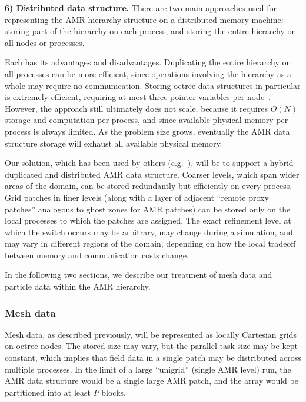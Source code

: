 \documentclass[10pt,twocolumn]{article}
\begin{document}
\textbf{6) Distributed data structure.} There are two main approaches
used for representing the AMR hierarchy structure on a distributed
memory machine: storing part of the hierarchy on each process, and
storing the entire hierarchy on all nodes or processes.

Each has its advantages and disadvantages.  Duplicating the entire
hierarchy on all processes can be more efficient, since operations
involving the hierarchy as a whole may require no communication.
Storing octree data structures in particular is extremely efficient,
requiring at most three pointer variables per node~\cite{FrPe02}.
However, the approach still ultimately does not scale, because it
requires $O(N)$ storage and computation per process, and since
available physical memory per process is always limited.  As the
problem size grows, eventually the AMR data structure storage will
exhaust all available physical memory.

Our solution, which has been used by others
(e.g.~\cite{@@@hybrid-storage}), will be to support a hybrid
duplicated and distributed AMR data structure.  Coarser levels, which
span wider areas of the domain, can be stored redundantly but
efficiently on every process.  Grid patches in finer levels (along
with a layer of adjacent ``remote proxy patches'' analogous to ghost
zones for AMR patches) can be stored only on the local processes to
which the patches are assigned.  The exact refinement level at which
the switch occurs may be arbitrary, may change during a simulation,
and may vary in different regions of the domain, depending on how the
local tradeoff between memory and communication costs change.

In the following two sections, we describe our treatment of mesh data
and particle data within the AMR hierarchy.

\subsubsection{Mesh data} \label{sss:design-fields}

Mesh data, as described previously, will be represented as locally
Cartesian grids on octree nodes.  The stored size may vary, but the
parallel task size may be kept constant, which implies that field data
in a single patch may be distributed across multiple processes.  In
the limit of a large ``unigrid'' (single AMR level) run, the AMR data
structure would be a single large AMR patch, and the array would be
partitioned into at least $P$ blocks.
\end{document}
